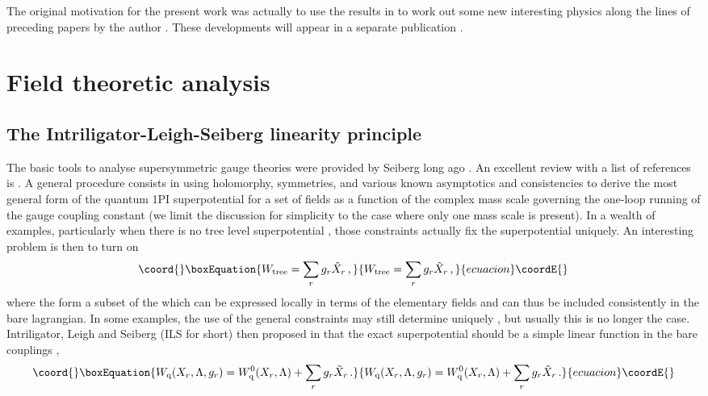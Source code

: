 \documentclass[a4paper,12pt]{article}
\def\wt{W_{\rm tree}}\def\weff{W_{\rm eff}}\def\ww{{\cal W}}
\begin{document}
The original motivation for the present work was actually to use the
results in \cite{DV} to work out some new interesting physics along
the lines of preceding papers by the author \cite{F}.
These developments will appear in a separate publication \cite{fer}.

%
\section{Field theoretic analysis}
%

%
\subsection{The Intriligator-Leigh-Seiberg linearity principle}
%

The basic tools to analyse \coordHE{} supersymmetric gauge theories
were provided by Seiberg long ago \cite{sei1}. An excellent review
with a list of references is \cite{revN1}. A general procedure
consists in using holomorphy, symmetries, and various known
asymptotics and consistencies to derive the most general form of the
quantum 1PI superpotential for a set of fields \coordHE{} as a
function of the complex mass scale \myHighlight{$\L$}\coordHE{} governing the one-loop running 
of the gauge coupling constant (we limit
the discussion for simplicity to the case where only one mass scale is
present). In a wealth of examples, particularly when there is no tree
level superpotential \myHighlight{$\wt$}\coordHE{}, those constraints actually fix the
superpotential \coordHE{} uniquely. An interesting problem
is then to turn on
%
\begin{equation}\coord{}\boxEquation{
\label{suplin}
\wt = \sum_{r} g_{r} \tilde X_{r}\, ,
}{
\wt = \sum_{r} g_{r} \tilde X_{r}\, ,
}{ecuacion}\coordE{}\end{equation}
%
where the \coordHE{} form a subset of the \coordHE{} which can be
expressed locally in terms of the elementary fields and can thus be
included consistently in the bare lagrangian. In some examples, the
use of the general constraints may still determine uniquely \coordHE{}, but usually this is no longer the case.
Intriligator, Leigh and Seiberg (ILS for short) then proposed in
\cite{ILS} that the exact superpotential should be a simple linear
function in the bare couplings \coordHE{},
%
\begin{equation}\coord{}\boxEquation{
\label{LP}
\wq (X_{r}, \L, g_{r}) = \wq^{0}(X_{r},\L) + \sum_{r} g_{r} \tilde
X_{r}\, .
}{
\wq (X_{r}, \L, g_{r}) = \wq^{0}(X_{r},\L) + \sum_{r} g_{r} \tilde
X_{r}\, .
}{ecuacion}\coordE{}\end{equation}
\end{document}
